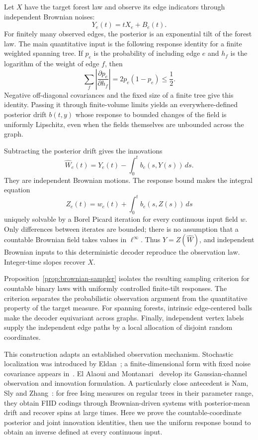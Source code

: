 Let $X$ have the target forest law and observe its edge indicators through
independent Brownian noises:
\[
 Y_e(t)=tX_e+B_e(t).
\]
For finitely many observed edges, the posterior is an exponential tilt of
the forest law. The main quantitative input is the following response
identity for a finite weighted spanning tree. If $p_e$ is the probability
of including edge $e$ and $h_f$ is the logarithm of the weight of edge $f$,
then
\[
 \sum_f\left|\frac{\partial p_e}{\partial h_f}\right|
 =2p_e(1-p_e)\le\frac12.
\]
Negative off-diagonal covariances and the fixed size of a finite tree give
this identity. Passing it through finite-volume limits yields an
everywhere-defined posterior drift $b(t,y)$ whose response to bounded
changes of the field is uniformly Lipschitz, even when the fields themselves
are unbounded across the graph.

Subtracting the posterior drift gives the innovations
\[
 \widehat W_e(t)=Y_e(t)-\int_0^t b_e(s,Y(s))\,ds.
\]
They are independent Brownian motions. The response bound makes the integral
equation
\[
 Z_e(t)=w_e(t)+\int_0^t b_e(s,Z(s))\,ds
\]
uniquely solvable by a Borel Picard iteration for every continuous input
field $w$. Only differences between iterates are bounded; there is no
assumption that a countable Brownian field takes values in $\ell^\infty$.
Thus $Y=Z(\widehat W)$, and independent Brownian inputs to this deterministic
decoder reproduce the observation law. Integer-time slopes recover $X$.

Proposition~\ref{prop:brownian-sampler} isolates the resulting sampling
criterion for countable binary laws with uniformly controlled finite-tilt
responses. The criterion separates the probabilistic observation argument
from the quantitative property of the target measure. For spanning forests,
intrinsic edge-centered balls make the decoder equivariant across graphs.
Finally, independent vertex labels supply the independent edge paths by a
local allocation of disjoint random coordinates.

This construction adapts an established observation mechanism. Stochastic
localization was introduced by Eldan~\cite{Eldan2013}; a finite-dimensional
form with fixed noise covariance appears
in~\cite[Section~2, Proposition~7]{Eldan2020}. El Alaoui and
Montanari~\cite[Section~3, Theorem~2]{ElAlaouiMontanari2022} develop its
Gaussian-channel observation and innovation formulation. A particularly
close antecedent is Nam, Sly and
Zhang~\cite[Theorem~1 and Section~2.2]{NamSlyZhang2022}: for free Ising
measures on regular trees in their parameter range, they obtain FIID
codings through Brownian-driven systems with posterior-mean drift and
recover spins at large times. Here we prove the countable-coordinate
posterior and joint innovation identities, then use the uniform response
bound to obtain an inverse defined at every continuous input.

